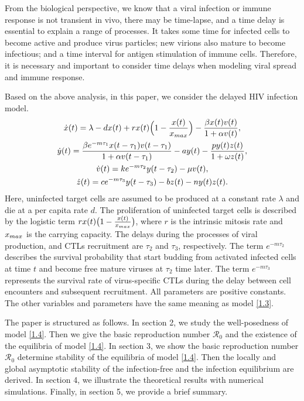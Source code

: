 \documentclass[10pt,a4paper]{amsart}
\numberwithin{equation}{section}
\begin{document}
From the biological perspective, we know that a viral infection or immune 
response is not transient in vivo, there may be time-lapse, and
a time delay is essential to explain a range of processes. 
It takes some time for infected cells to become active and produce virus particles; 
new virions also mature to become  infectious; and a time interval for antigen 
stimulation of immune cells. Therefore, it is necessary and important to consider time 
delays when modeling viral spread and  immune response.

 Based on the above analysis, in this paper, we consider the  
  delayed HIV infection model.
\begin{equation}\label{1.4}
\begin{gathered}
\dot{x}(t)=\lambda-dx(t)+rx(t)\Big(1-{\frac{x(t)}{x_{\rm max}}}\Big)-{\frac{\beta x(t)v(t)}{1+\alpha v(t)}},\\
\dot{y}(t)={\frac{\beta e^{-m\tau_1}x(t-\tau_1)v(t-\tau_1)}{1+\alpha v(t-\tau_1)}}-ay(t)-{\frac{py(t)z(t)}{1+\omega z(t)}},\\
\dot{v}(t)=k e^{-m\tau_2}y(t-\tau_2)-\mu v(t),\\
\dot{z}(t)=ce^{-m\tau_3}y(t-\tau_3)-bz(t)-ny(t)z(t).
\end{gathered}
\end{equation}
Here, uninfected target cells are assumed to be produced at a constant rate $\lambda$ 
and die at a per capita rate $d$. The proliferation of uninfected target cells is 
described by the logistic term $rx(t)\big(1-\frac{x(t)}{x_{\rm max}}\big)$, where
$r$ is the intrinsic mitosis rate and $x_{\rm max}$ is the carrying capacity. 
The delays during the processes of  viral production, and CTLs recruitment are $\tau_2$ 
and $\tau_3$, respectively. The term $ e^{-m\tau_2}$ describes the survival probability 
that start budding from activated infected cells at time $t$ and become free mature 
viruses at $\tau_2$ time later. The term $ e^{-m\tau_3}$ represents the survival rate 
of virus-specific CTLs during the delay
between cell encounters and subsequent recruitment. 
All parameters are positive constants. The other variables and parameters have the 
same meaning as model \eqref{1.3}.

The paper is structured as follows. 
In section 2, we study the well-posedness of model \eqref{1.4}. Then we give the 
basic reproduction number $\mathcal{R}_0$ and
the existence of the equilibria of  model \eqref{1.4}. 
In section 3, we show the basic reproduction number $\mathcal{R}_0$ determine
stability of the equilibria of model \eqref{1.4}. Then the locally  and global
asymptotic stability of the infection-free and the infection equilibrium
are derived.
In section 4, we illustrate the theoretical results with numerical simulations. 
Finally, in section 5, we provide a brief summary.
\end{document}
